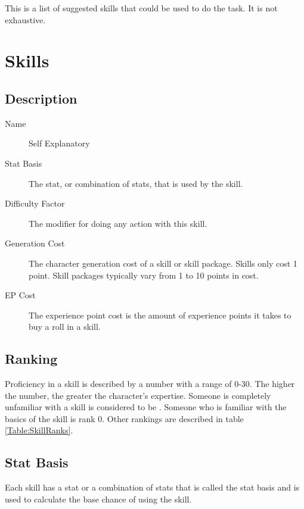 This is a list of suggested skills that could be used to do the task. 
It is not exhaustive.

\section{Skills}

\subsection{Description}

\begin{description}
	\item[Name] 
	Self Explanatory
	\item[Stat Basis] 
	The stat, or combination of stats, that is used by the skill. 
	\item[Difficulty Factor] 
	The modifier for doing any action with this skill.
	\item[Generation Cost]
	The character generation cost of a skill or skill package. Skills
	only cost 1 point. Skill packages typically vary from 1
	to 10 points in cost.
	\item[EP Cost] 
	The experience point cost is the amount of experience points it takes to
	buy a roll in a skill. 
\end{description}

\subsection{Ranking}

Proficiency in a skill is described by a number with a range of 0-30.
The higher the number, the greater the character's expertise. Someone
is completely unfamiliar with a skill is considered to be
. Someone who is familiar with the basics of
the skill is rank 0. Other rankings are described in table
\ref{Table:SkillRanks}.



\subsection{Stat Basis}

Each skill has a stat or a combination of stats that is called the
stat basis and is used to calculate the base chance of using the 
skill. 


